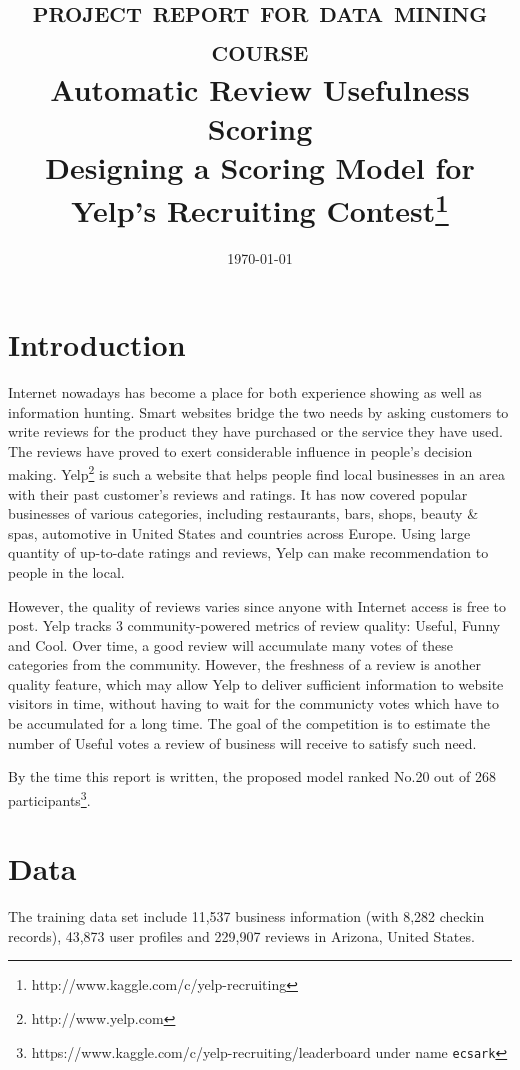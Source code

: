 \documentclass[a4paper,12pt,title]{article}
\title{\textsc{\hspace{-15pt} \Large{project report for data mining course}}\\Automatic Review Usefulness Scoring\\ [10pt] \normalsize{Designing a Scoring Model for Yelp's Recruiting Contest\footnote{http://www.kaggle.com/c/yelp-recruiting}}}
\date{\today}
\begin{document}
%
\maketitle

\section{Introduction}
Internet nowadays has become a place for both experience showing as well as information hunting. Smart websites bridge the two needs by asking customers to write reviews for the product they have purchased or the service they have used. The reviews have proved to exert considerable influence in people's decision making\cite{mouthonsales}. Yelp\footnote{http://www.yelp.com} is such a website that helps people find local businesses in an area with their past customer's reviews and ratings. It has now covered popular businesses of various categories, including restaurants, bars, shops, beauty \& spas, automotive in United States and countries across Europe. Using large quantity of up-to-date ratings and reviews, Yelp can make recommendation to people in the local.

However, the quality of reviews varies since anyone with Internet access is free to post. Yelp tracks 3 community-powered metrics of review quality: Useful, Funny and Cool. Over time, a good review will accumulate many votes of these categories from the community. However, the freshness of a review is another quality feature, which may allow Yelp to deliver sufficient information to website visitors in time, without having to wait for the communicty votes which have to be accumulated for a long time. The goal of the competition is to estimate the number of Useful votes a review of business will receive to satisfy such need.

By the time this report is written, the proposed model ranked No.20 out of 268 participants\footnote{https://www.kaggle.com/c/yelp-recruiting/leaderboard under name \texttt{ecsark}}.

\section{Data}
The training data set include 11,537 business information (with 8,282 checkin records), 43,873 user profiles and 229,907 reviews in Arizona, United States. 
\end{document}
